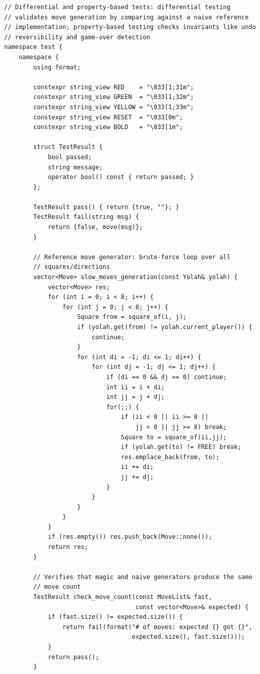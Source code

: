 \documentclass[12pt,a4paper,twoside,openright]{book}
\begin{document}
\begin{mdframed}[skipabove=\baselineskip,topline=false,rightline=false,bottomline=false,leftline=false,linewidth=1pt,linecolor=gray!40,innerleftmargin=8pt]
\begin{verbatim}
// Differential and property-based tests: differential testing 
// validates move generation by comparing against a naive reference 
// implementation; property-based testing checks invariants like undo 
// reversibility and game-over detection
namespace test {
    namespace {
        using format;

        constexpr string_view RED    = "\033[1;31m";
        constexpr string_view GREEN  = "\033[1;32m";
        constexpr string_view YELLOW = "\033[1;33m";
        constexpr string_view RESET  = "\033[0m";
        constexpr string_view BOLD   = "\033[1m";

        struct TestResult {
            bool passed;
            string message;
            operator bool() const { return passed; }
        };

        TestResult pass() { return {true, ""}; }
        TestResult fail(string msg) { 
            return {false, move(msg)}; 
        }

        // Reference move generator: brute-force loop over all 
        // squares/directions
        vector<Move> slow_moves_generation(const Yolah& yolah) {
            vector<Move> res;
            for (int i = 0; i < 8; i++) {
                for (int j = 0; j < 8; j++) {
                    Square from = square_of(i, j);
                    if (yolah.get(from) != yolah.current_player()) {
                        continue;
                    }
                    for (int di = -1; di <= 1; di++) {
                        for (int dj = -1; dj <= 1; dj++) {
                            if (di == 0 && dj == 0) continue;
                            int ii = i + di;
                            int jj = j + dj;
                            for(;;) {
                                if (ii < 0 || ii >= 8 || 
                                    jj < 0 || jj >= 8) break;
                                Square to = square_of(ii,jj);                                
                                if (yolah.get(to) != FREE) break;                                
                                res.emplace_back(from, to);
                                ii += di;
                                jj += dj;
                            }
                        }
                    }
                }
            }
            if (res.empty()) res.push_back(Move::none());
            return res;
        }

        // Verifies that magic and naive generators produce the same 
        // move count
        TestResult check_move_count(const MoveList& fast, 
                                    const vector<Move>& expected) {
            if (fast.size() != expected.size()) {
                return fail(format("# of moves: expected {} got {}", 
                                   expected.size(), fast.size()));
            }
            return pass();
        }


\end{verbatim}
\end{mdframed}
\end{document}
